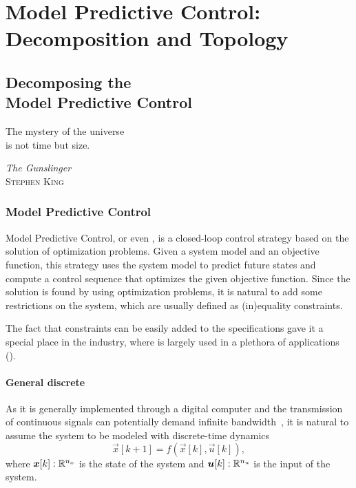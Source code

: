 \documentclass[../main.tex]{subfiles}
\begin{document}


\part{Model Predictive Control: Decomposition and Topology}

\chapter[Decomposing the Model Predictive Control]{Decomposing the\\ Model Predictive Control}
\epigraph{\centering The mystery of the universe \\ is not time but size.}
{\textit{The Gunslinger}\\\textsc{Stephen King}}

\minitoc

\section{Model Predictive Control}
Model Predictive Control, or even \mpc, is a closed-loop control strategy based
on the solution of optimization problems.
Given a system model and an objective function, this strategy uses the system model to predict future states and compute a control sequence that optimizes the given objective function.
Since the solution is found by using optimization problems, it is natural to add some restrictions on the system, which are usually defined as (in)equality constraints.

The fact that constraints can be easily added to the specifications gave it a special place in the industry, where is largely used in a plethora of applications ().

\subsection{General discrete \mpc\ }
As it is generally implemented through a digital computer and the transmission of continuous signals can potentially demand infinite bandwidth~\cite{HeEtAl2022}, it is natural to assume the system to be modeled with discrete-time dynamics
\begin{equation}
\vec{x}[k+1]=f(\vec{x}[k],\vec{u}[k]),
\end{equation}
where $\boldsymbol{x}[k]:\mathbb{R}^{n_{x}}$ is the state of the system and $\boldsymbol{u}[k]:\mathbb{R}^{n_{u}}$ is the input of the system.
\end{document}
